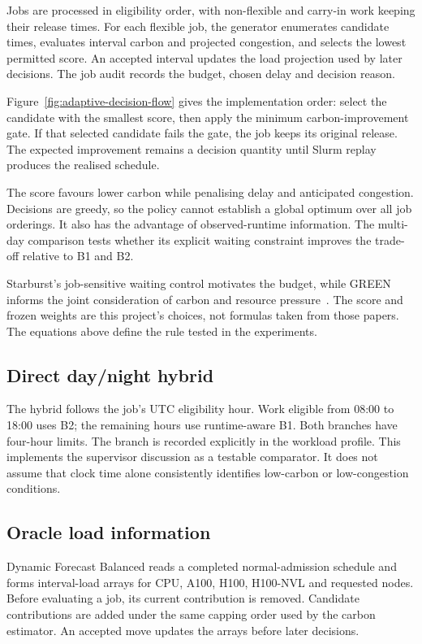 Jobs are processed in eligibility order, with non-flexible and carry-in work keeping their release times. For each flexible job, the generator enumerates candidate times, evaluates interval carbon and projected congestion, and selects the lowest permitted score. An accepted interval updates the load projection used by later decisions. The job audit records the budget, chosen delay and decision reason.

Figure~\ref{fig:adaptive-decision-flow} gives the implementation order: select the candidate with the smallest score, then apply the minimum carbon-improvement gate. If that selected candidate fails the gate, the job keeps its original release. The expected improvement remains a decision quantity until Slurm replay produces the realised schedule.


The score favours lower carbon while penalising delay and anticipated congestion. Decisions are greedy, so the policy cannot establish a global optimum over all job orderings. It also has the advantage of observed-runtime information. The multi-day comparison tests whether its explicit waiting constraint improves the trade-off relative to B1 and B2.

Starburst's job-sensitive waiting control motivates the budget, while GREEN informs the joint consideration of carbon and resource pressure~\cite{luo2024starburst,xu2025green}. The score and frozen weights are this project's choices, not formulas taken from those papers. The equations above define the rule tested in the experiments.

\FloatBarrier
\subsection{Direct day/night hybrid}
The hybrid follows the job's UTC eligibility hour. Work eligible from 08:00 to 18:00 uses B2; the remaining hours use runtime-aware B1. Both branches have four-hour limits. The branch is recorded explicitly in the workload profile. This implements the supervisor discussion as a testable comparator. It does not assume that clock time alone consistently identifies low-carbon or low-congestion conditions.

\subsection{Oracle load information}
Dynamic Forecast Balanced reads a completed normal-admission schedule and forms interval-load arrays for CPU, A100, H100, H100-NVL and requested nodes. Before evaluating a job, its current contribution is removed. Candidate contributions are added under the same capping order used by the carbon estimator. An accepted move updates the arrays before later decisions.

